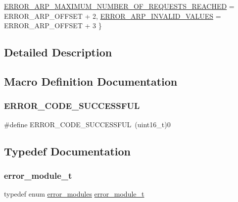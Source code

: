 \begin{DoxyCompactItemize}
\mbox{\hyperlink{group__error_ggadc6f7acf887618df05bc50c50fee037ba1de61ce85d3e162bfa397bdbe9919114}{E\+R\+R\+O\+R\+\_\+\+A\+R\+P\+\_\+\+M\+A\+X\+I\+M\+U\+M\+\_\+\+N\+U\+M\+B\+E\+R\+\_\+\+O\+F\+\_\+\+R\+E\+Q\+U\+E\+S\+T\+S\+\_\+\+R\+E\+A\+C\+H\+ED}} = E\+R\+R\+O\+R\+\_\+\+A\+R\+P\+\_\+\+O\+F\+F\+S\+ET + 2, 
\mbox{\hyperlink{group__error_ggadc6f7acf887618df05bc50c50fee037ba9b91278de8312021b894a38f98265320}{E\+R\+R\+O\+R\+\_\+\+A\+R\+P\+\_\+\+I\+N\+V\+A\+L\+I\+D\+\_\+\+V\+A\+L\+U\+ES}} = E\+R\+R\+O\+R\+\_\+\+A\+R\+P\+\_\+\+O\+F\+F\+S\+ET + 3
 \}
\end{DoxyCompactItemize}


\subsection{Detailed Description}


\subsection{Macro Definition Documentation}
\mbox{\label{group__error_gacdd581bef905616f588f5be6b5a5bae3}} 
\subsubsection{\texorpdfstring{ERROR\_CODE\_SUCCESSFUL}{ERROR\_CODE\_SUCCESSFUL}}
{\footnotesize\ttfamily \#define E\+R\+R\+O\+R\+\_\+\+C\+O\+D\+E\+\_\+\+S\+U\+C\+C\+E\+S\+S\+F\+UL~(uint16\+\_\+t)0}



\subsection{Typedef Documentation}
\mbox{\label{group__error_ga07aaf66e281b4d8635efe00e6402f4a3}} 
\subsubsection{\texorpdfstring{error\_module\_t}{error\_module\_t}}
{\footnotesize\ttfamily typedef enum \mbox{\hyperlink{group__error_ga8a4a6940eb9ce245840c7e0af23a8b7c}{error\+\_\+modules}}  \mbox{\hyperlink{group__error_ga07aaf66e281b4d8635efe00e6402f4a3}{error\+\_\+module\+\_\+t}}}


